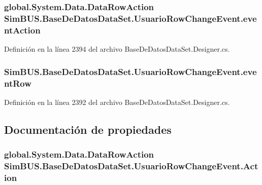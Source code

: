 \subsubsection[{event\-Action}]{\setlength{\rightskip}{0pt plus 5cm}global.\-System.\-Data.\-Data\-Row\-Action Sim\-B\-U\-S.\-Base\-De\-Datos\-Data\-Set.\-Usuario\-Row\-Change\-Event.\-event\-Action\hspace{0.3cm}{\ttfamily [private]}}\label{class_sim_b_u_s_1_1_base_de_datos_data_set_1_1_usuario_row_change_event_a5a9cb66af45ca19e39fc6fc407578705}


Definición en la línea 2394 del archivo Base\-De\-Datos\-Data\-Set.\-Designer.\-cs.

\subsubsection[{event\-Row}]{ Sim\-B\-U\-S.\-Base\-De\-Datos\-Data\-Set.\-Usuario\-Row\-Change\-Event.\-event\-Row\hspace{0.3cm}{\ttfamily [private]}}\label{class_sim_b_u_s_1_1_base_de_datos_data_set_1_1_usuario_row_change_event_aa57f70abfd68185b2179e58df678e7e7}


Definición en la línea 2392 del archivo Base\-De\-Datos\-Data\-Set.\-Designer.\-cs.



\subsection{Documentación de propiedades}
\subsubsection[{Action}]{\setlength{\rightskip}{0pt plus 5cm}global.\-System.\-Data.\-Data\-Row\-Action Sim\-B\-U\-S.\-Base\-De\-Datos\-Data\-Set.\-Usuario\-Row\-Change\-Event.\-Action\hspace{0.3cm}{\ttfamily [get]}}\label{class_sim_b_u_s_1_1_base_de_datos_data_set_1_1_usuario_row_change_event_a6bed13fe5838aa1d7af9edfed19114f2}


